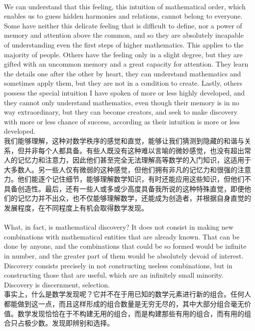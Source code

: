\documentclass{article}
\begin{document}
\\
We can understand that this feeling, this intuition of mathematical order, which enables us to guess hidden harmonies and relations, cannot belong to everyone. Some have neither this delicate feeling that is difficult to define, nor a power of memory and attention above the common, and so they are absolutely incapable of understanding even the first steps of higher mathematics. This applies to the majority of people. Others have the feeling only in a slight degree, but they are gifted with an uncommon memory and a great capacity for attention. They learn the details one after the other by heart, they can understand mathematics and sometimes apply them, but they are not in a condition to create. Lastly, others possess the special intuition I have spoken of more or less highly developed, and they cannot only understand mathematics, even though their memory is in no way extraordinary, but they can become creators, and seek to make discovery with more or less chance of success, according as their intuition is more or less developed.\\
我们能够理解，这种对数学秩序的感觉和直觉，能够让我们猜测到隐藏的和谐与关系，但并非每个人都具备。有些人既没有这种难以言喻的微妙感觉，也没有超出常人的记忆力和注意力，因此他们甚至完全无法理解高等数学的入门知识，这适用于大多数人。另一些人仅有微弱的这种感觉，但他们拥有非凡的记忆力和很强的注意力。他们能逐个记住细节，能够理解数学知识，有时还能应用这些知识，但他们不具备创造性。最后，还有一些人或多或少高度具备我所说的这种特殊直觉，即便他们的记忆力并不出众，也不仅能够理解数学，还能成为创造者，并根据自身直觉的发展程度，在不同程度上有机会取得数学发现。 \\

\\
What, in fact, is mathematical discovery? It does not consist in making new combinations with mathematical entities that are already known. That can be done by anyone, and the combinations that could be so formed would be infinite in number, and the greater part of them would be absolutely devoid of interest. Discovery consists precisely in not constructing useless combinations, but in constructing those that are useful, which are an infinitely small minority. Discovery is discernment, selection.\\
事实上，什么是数学发现呢？它并不在于用已知的数学元素进行新的组合。任何人都能做到这一点，而且这样形成的组合数量是无穷无尽的，其中大部分组合毫无价值。数学发现恰恰在于不构建无用的组合，而是构建那些有用的组合，而有用的组合只占极少数。发现即辨别和选择。 \\
\end{document}
